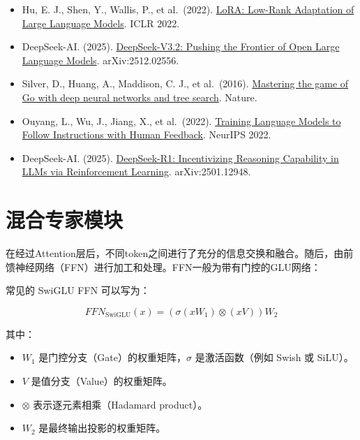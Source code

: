 \vspace{0.25em}
\begin{itemize}
\tightlist
\item
  Hu, E. J., Shen, Y., Wallis, P., et al.~(2022). \href{https://arxiv.org/abs/2106.09685}{LoRA: Low-Rank Adaptation of Large Language Models}. ICLR 2022.
\item
  DeepSeek-AI. (2025). \href{https://arxiv.org/abs/2512.02556}{DeepSeek-V3.2: Pushing the Frontier of Open Large Language Models}. arXiv:2512.02556.
\item
  Silver, D., Huang, A., Maddison, C. J., et al.~(2016). \href{https://www.nature.com/articles/nature16961}{Mastering the game of Go with deep neural networks and tree search}. Nature.
\item
  Ouyang, L., Wu, J., Jiang, X., et al.~(2022). \href{https://arxiv.org/abs/2203.02155}{Training Language Models to Follow Instructions with Human Feedback}. NeurIPS 2022.
\item
  DeepSeek-AI. (2025). \href{https://arxiv.org/abs/2501.12948}{DeepSeek-R1: Incentivizing Reasoning Capability in LLMs via Reinforcement Learning}. arXiv:2501.12948.
\end{itemize}

\clearpage

\hypertarget{ux6df7ux5408ux4e13ux5bb6ux6a21ux5757}{%
\section{混合专家模块}\label{ux6df7ux5408ux4e13ux5bb6ux6a21ux5757}}

在经过Attention层后，不同token之间进行了充分的信息交换和融合。随后，由前馈神经网络（FFN）进行加工和处理。FFN一般为带有门控的GLU网络：

常见的 SwiGLU FFN 可以写为：

\[
FFN_{\mathrm{SwiGLU}}(x) = (\sigma(xW_1) \otimes (xV))W_2
\]

其中：

\begin{itemize}
\tightlist
\item
  \(W_1\) 是门控分支（Gate）的权重矩阵，\(\sigma\) 是激活函数（例如 Swish 或 SiLU）。
\item
  \(V\) 是值分支（Value）的权重矩阵。
\item
  \(\otimes\) 表示逐元素相乘（Hadamard product）。
\item
  \(W_2\) 是最终输出投影的权重矩阵。
\end{itemize}

